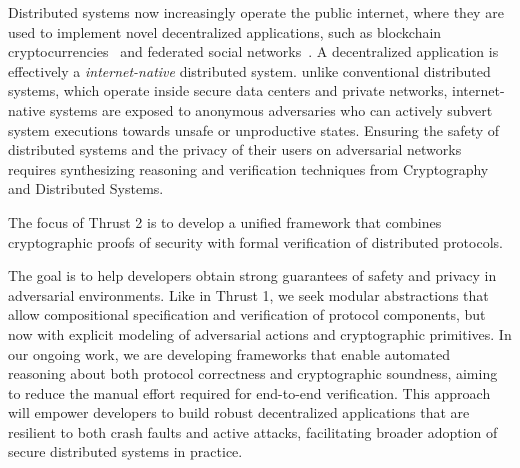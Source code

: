 Distributed systems now increasingly operate the public internet, where
they are used to implement novel decentralized applications, such as
blockchain cryptocurrencies~\cite{nakamoto-bitcoin08,buterin-eth14} and
federated social networks~\cite{mastodon,bluesky}. A decentralized
application is effectively a \emph{internet-native} distributed system.
unlike conventional distributed systems, which operate inside secure data
centers and private networks, internet-native systems are exposed to
anonymous adversaries who can actively subvert system executions towards
unsafe or unproductive states. Ensuring the safety of distributed systems
and the privacy of their users on adversarial networks requires
synthesizing reasoning and verification techniques from Cryptography and
Distributed Systems.
\begin{mdquote}
  The focus of Thrust 2 is to develop a unified framework that combines cryptographic proofs of security with formal verification of distributed protocols. 
\end{mdquote}
\noindent The goal is to help developers obtain strong guarantees of safety
and privacy in adversarial environments. Like in Thrust 1, we seek modular
abstractions that allow compositional specification and verification of
protocol components, but now with explicit modeling of adversarial actions
and cryptographic primitives. In our ongoing work, we are developing
frameworks that enable automated reasoning about both protocol correctness
and cryptographic soundness, aiming to reduce the manual effort required
for end-to-end verification. This approach will empower developers to build
robust decentralized applications that are resilient to both crash faults
and active attacks, facilitating broader adoption of secure distributed
systems in practice.

